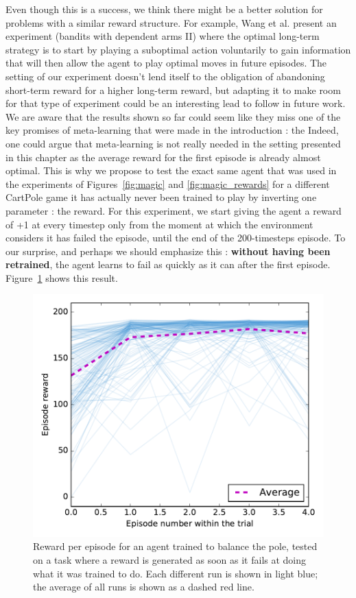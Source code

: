 Even though this is a success, we think there might be a better solution for
problems with a similar reward structure. For example, Wang et al.
\cite{learningtorl} present an experiment (bandits with dependent arms II) 
where the optimal long-term strategy is to start by playing a suboptimal action
voluntarily to gain information that will then allow the agent to play
optimal moves in future episodes. The setting of our experiment doesn't lend
itself to the obligation of abandoning short-term reward for a higher long-term
reward, but adapting it to make room for that type of experiment could be
an interesting lead to follow in future work.\\

We are aware that the results shown so far could seem like they miss one 
of the key promises of meta-learning that were made in the introduction :
the  Indeed,
one could argue that meta-learning is not really needed in the setting
presented in this chapter as the average reward for the first episode is 
already almost optimal. This is why we propose to test the exact same agent
that was used in the experiments of Figures~\ref{fig:magic} and 
\ref{fig:magic_rewards} for a different CartPole game it has 
actually never been trained to play by inverting one parameter : the reward.
For this experiment, we start giving the agent a reward of +1 at every timestep
only from the moment at which the environment considers it has failed the
episode, until the end of the 200-timesteps episode. 
To our surprise, and perhaps we should emphasize this : 
\textbf{without having been retrained}, the agent learns to fail as quickly
as it can after the first episode. Figure~\ref{fig:magic_magic} shows this
result.

\begin{figure}
	\centering
	\includegraphics[width=0.8\linewidth]{fig/magic_magic.pdf}
	\caption{Reward per episode for an agent trained to balance the pole,
	tested on a task where a reward is generated as soon as it fails at
	doing what it was trained to do. Each different run is shown in light
	blue; the average of all runs is shown as a dashed red line.}
	\label{fig:magic_magic}
\end{figure}

